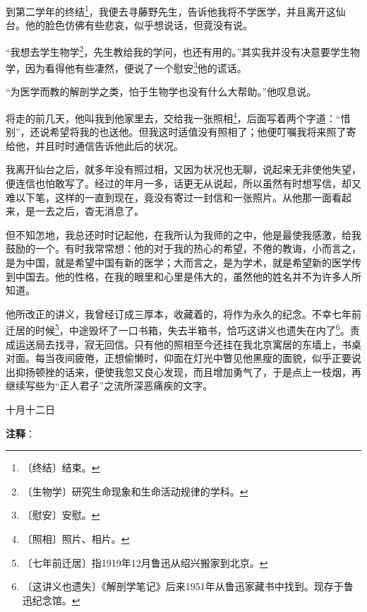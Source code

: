 \documentclass[12pt,UTF-8,openany]{ctexbook}
\begin{document}
\begin{normalsize}
    到第二学年的终结\footnote{〔终结〕结束。}，我便去寻藤野先生，告诉他我将不学医学，并且离开这仙台。他的脸色仿佛有些悲哀，似乎想说话，但竟没有说。
    
    “我想去学生物学\footnote{〔生物学〕研究生命现象和生命活动规律的学科。}，先生教给我的学问，也还有用的。”其实我并没有决意要学生物学，因为看得他有些凄然，便说了一个慰安\footnote{〔慰安〕安慰。}他的谎话。
    
    “为医学而教的解剖学之类，怕于生物学也没有什么大帮助。”他叹息说。
    
    将走的前几天，他叫我到他家里去，交给我一张照相\footnote{〔照相〕照片、相片。}，后面写着两个字道：“惜别”，还说希望将我的也送他。但我这时适值没有照相了；他便叮嘱我将来照了寄给他，并且时时通信告诉他此后的状况。
    
    我离开仙台之后，就多年没有照过相，又因为状况也无聊，说起来无非使他失望，便连信也怕敢写了。经过的年月一多，话更无从说起，所以虽然有时想写信，却又难以下笔，这样的一直到现在，竟没有寄过一封信和一张照片。从他那一面看起来，是一去之后，杳无消息了。
    
    但不知怎地，我总还时时记起他，在我所认为我师的之中，他是最使我感激，给我鼓励的一个。有时我常常想：他的对于我的热心的希望，不倦的教诲，小而言之，是为中国，就是希望中国有新的医学；大而言之，是为学术，就是希望新的医学传到中国去。他的性格，在我的眼里和心里是伟大的，虽然他的姓名并不为许多人所知道。
    
    他所改正的讲义，我曾经订成三厚本，收藏着的，将作为永久的纪念。不幸七年前迁居的时候\footnote{〔七年前迁居〕指1919年12月鲁迅从绍兴搬家到北京。}，中途毁坏了一口书箱，失去半箱书，恰巧这讲义也遗失在内了\footnote{〔这讲义也遗失〕《解剖学笔记》后来1951年从鲁迅家藏书中找到。现存于鲁迅纪念馆。}。责成运送局去找寻，寂无回信。只有他的照相至今还挂在我北京寓居的东墙上，书桌对面。每当夜间疲倦，正想偷懒时，仰面在灯光中瞥见他黑瘦的面貌，似乎正要说出抑扬顿挫的话来，便使我忽又良心发现，而且增加勇气了，于是点上一枝烟，再继续写些为“正人君子”之流所深恶痛疾的文字。
    
    \hfill 十月十二日
    
\end{normalsize}


\newpage

\textbf{注释}：

\vspace{-1em}
\end{document}
